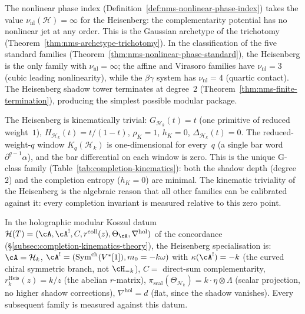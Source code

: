 \begin{remark}
\label{rem:heisenberg-phase-index}
The nonlinear phase index
(Definition~\ref{def:nms-nonlinear-phase-index}) takes the value
$\nu_{\mathrm{nl}}(\mathcal{H}) = \infty$ for the Heisenberg: the
complementarity potential has no nonlinear jet at any order. This is
the Gaussian archetype of the trichotomy
(Theorem~\ref{thm:nms-archetype-trichotomy}). In the classification
of the five standard families
(Theorem~\ref{thm:nms-nonlinear-phase-standard}), the Heisenberg
is the only family with $\nu_{\mathrm{nl}} = \infty$; the affine and
Virasoro families have $\nu_{\mathrm{nl}} = 3$ (cubic leading
nonlinearity), while the $\beta\gamma$ system has
$\nu_{\mathrm{nl}} = 4$ (quartic contact). The Heisenberg shadow
tower terminates at degree~$2$
(Theorem~\ref{thm:nms-finite-termination}), producing the simplest
possible modular package.
\end{remark}

\begin{remark}
\label{rem:heisenberg-completion-kinematics}
The Heisenberg is kinematically trivial: $G_{\mathcal{H}_k}(t) = t$
(one primitive of reduced weight~$1$),
$H_{\mathcal{H}_k}(t) = t/(1-t)$, $\rho_K = 1$, $h_K = 0$,
$\Delta_{\mathcal{H}_k}(t) = 0$. The reduced-weight-$q$ window
$K_q(\mathcal{H}_k)$ is one-dimensional for every~$q$ (a single
bar word $\partial^{q-1}\alpha$), and the bar differential on each
window is zero. This is the unique G-class family
(Table~\ref{tab:completion-kinematics}): both the shadow depth
(degree~$2$) and the completion entropy ($h_K = 0$) are minimal.
The kinematic triviality of the Heisenberg is the algebraic reason
that all other families can be calibrated against it: every
completion invariant is measured relative to this zero point.

In the holographic modular Koszul datum
$\mathcal{H}(T) = (\cA, \cA^!, C, r^{\mathrm{coll}}(z), \Theta_\cA, \nabla^{\mathrm{hol}})$
of the concordance
(\S\ref{subsec:completion-kinematics-theory}),
the Heisenberg specialisation is: $\cA = \mathcal{H}_k$,
$\cA^!=(\operatorname{Sym}^{\mathrm{ch}}(V^*[1]),m_0=-k\omega)$ with $\kappa(\cA^!) = -k$ (the curved chiral symmetric branch, not $\cH_{-k}$),
$C = $ direct-sum complementarity,
$r^{\mathrm{Heis}}_k(z) = k/z$ (the abelian $r$-matrix),
$\pi_{\mathrm{scal}}(\Theta_{\mathcal{H}_k})
= k \cdot \eta \otimes \Lambda$
(scalar projection, no higher shadow corrections),
$\nabla^{\mathrm{hol}} = d$ (flat, since the shadow vanishes).
Every subsequent family is measured against this datum.
\end{remark}


